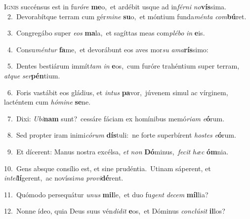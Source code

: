 \lettrine{\initial\textcolor{\initialcolor}{I}}{gnis} succénsus est in fu\-\textit{ró}\-\textit{re} \textbf{me}\-o,~\star et ardébit usque ad in\-\textit{fér}\-\textit{ni} \textit{no}\-\textbf{vís}sima.\\
{\numbfont\textcolor{\numbcolor}{~2.}}~Devorabítque terram cum gér\-\textit{mi}\-\textit{ne} \textbf{su}\-o,~\star et móntium funda\-\textit{mén}\-\textit{ta} \textit{com}\-\textbf{bú}ret.\par
{\numbfont\textcolor{\numbcolor}{~3.}}~Congregábo super \textit{e}\-\textit{os} \textbf{ma}\-la,~\star et sagíttas meas com\-\textit{plé}\-\textit{bo} \textit{in} \textbf{e}\-is.\par
{\numbfont\textcolor{\numbcolor}{~4.}}~Consu\-\textit{mén}\-\textit{tur} \textbf{fa}\-me,~\star et devorábunt eos aves mor\textit{su} \textit{a}\-\textit{ma}\textbf{rís}simo:\par
{\numbfont\textcolor{\numbcolor}{~5.}}~Dentes bestiárum immít\textit{tam} \textit{in} \textbf{e}\-os,~\star cum furóre trahéntium super terram, \textit{at}\-\textit{que} \textit{ser}\-\textbf{pén}tium.\par
{\numbfont\textcolor{\numbcolor}{~6.}}~Foris vastábit eos gládius, et \textit{in}\-\textit{tus} \textbf{pa}\-vor,~\star júvenem simul ac vírginem, lacténtem cum \textit{hó}\-\textit{mi}\textit{ne} \textbf{se}\-ne.\par
{\numbfont\textcolor{\numbcolor}{~7.}}~Dixi: \textit{U}\-\textit{bi}\textbf{nam} sunt?~\star cessáre fáciam ex homínibus memó\-\textit{ri}\-\textit{am} \textit{e}\-\textbf{ó}rum.\par
{\numbfont\textcolor{\numbcolor}{~8.}}~Sed propter iram inimi\-\textit{có}\-\textit{rum} \textbf{dís}\-tuli:~\star ne forte superbírent \textit{hos}\-\textit{tes} \textit{e}\-\textbf{ó}rum.\par
{\numbfont\textcolor{\numbcolor}{~9.}}~Et dícerent: Manus nostra excélsa, \textit{et} \textit{non} \textbf{Dó}\-minus,~\star \textit{fe}\-\textit{cit} \textit{hæc} \textbf{óm}\-nia.\par
{\numbfont\textcolor{\numbcolor}{10.}}~Gens absque consílio est, et sine prudéntia.~\dagger Utinam sáperent, et \textit{in}\-\textit{tel}\textbf{lí}gerent,~\star ac novíssi\textit{ma} \textit{pro}\-\textit{vi}\textbf{dé}rent.\par
{\numbfont\textcolor{\numbcolor}{11.}}~Quómodo persequátur \textit{u}\-\textit{nus} \textbf{mil}\-le,~\star et duo fu\textit{gent} \textit{de}\-\textit{cem} \textbf{míl}\-lia?\par
{\numbfont\textcolor{\numbcolor}{12.}}~Nonne ídeo, quia Deus suus vén\-\textit{di}\-\textit{dit} \textbf{e}\-os,~\star et Dóminus \textit{con}\-\textit{clú}\textit{sit} \textbf{il}\-los?\par
